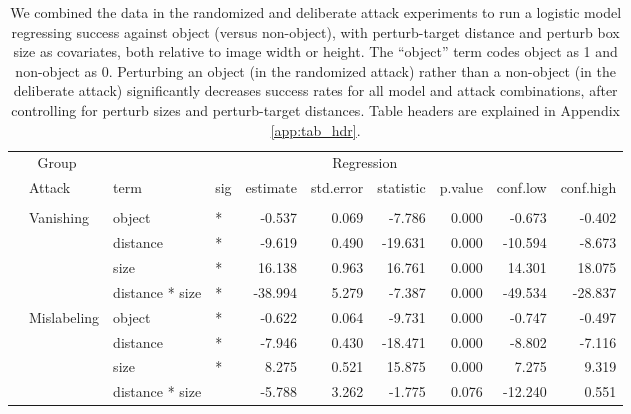 \documentclass[
]{article}
\begin{document}
\begin{longtable}[t]{llllrrrrrr}
\caption{\label{tab:rand_arb_compare_table}We combined the data in the randomized and deliberate attack experiments to run a logistic model regressing success against object (versus non-object), with perturb-target distance and perturb box size as covariates, both relative to image width or height. The ``object'' term codes object as 1 and non-object as 0. Perturbing an object (in the randomized attack) rather than a non-object (in the deliberate attack) significantly decreases success rates for all model and attack combinations, after controlling for perturb sizes and perturb-target distances. Table headers are explained in Appendix \ref{app:tab_hdr}.}\\
\toprule
\multicolumn{2}{c}{Group} & \multicolumn{8}{c}{Regression} \\
\cmidrule(l{3pt}r{3pt}){1-2} \cmidrule(l{3pt}r{3pt}){3-10}
 & Attack & term & sig & estimate & std.error & statistic & p.value & conf.low & conf.high\\
\midrule
\addlinespace[0.3em]
\multicolumn{10}{l}{\textbf{YOLOv3}}\\
\hspace{1em} & Vanishing & object & * & -0.537 & 0.069 & -7.786 & 0.000 & -0.673 & -0.402\\
\cmidrule{3-10}\nopagebreak
\hspace{1em} &  & distance & * & -9.619 & 0.490 & -19.631 & 0.000 & -10.594 & -8.673\\
\cmidrule{3-10}\nopagebreak
\hspace{1em} &  & size & * & 16.138 & 0.963 & 16.761 & 0.000 & 14.301 & 18.075\\
\cmidrule{3-10}\nopagebreak
\hspace{1em} &  & distance * size & * & -38.994 & 5.279 & -7.387 & 0.000 & -49.534 & -28.837\\
\cmidrule{2-10}\nopagebreak
\hspace{1em} & Mislabeling & object & * & -0.622 & 0.064 & -9.731 & 0.000 & -0.747 & -0.497\\
\cmidrule{3-10}\nopagebreak
\hspace{1em} &  & distance & * & -7.946 & 0.430 & -18.471 & 0.000 & -8.802 & -7.116\\
\cmidrule{3-10}\nopagebreak
\hspace{1em} &  & size & * & 8.275 & 0.521 & 15.875 & 0.000 & 7.275 & 9.319\\
\cmidrule{3-10}\nopagebreak
\hspace{1em} &  & distance * size &  & -5.788 & 3.262 & -1.775 & 0.076 & -12.240 & 0.551\\

\end{longtable}
\end{document}
